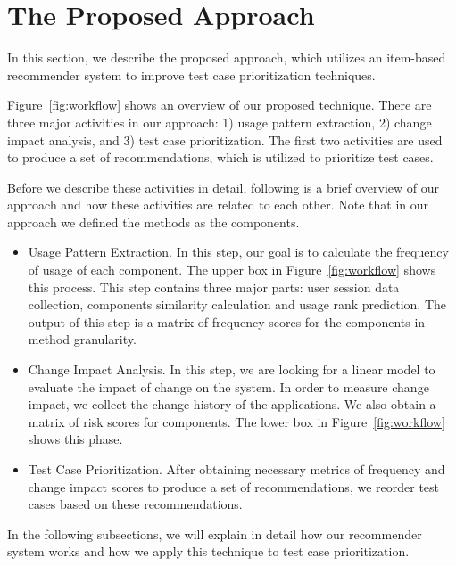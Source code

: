 \vspace*{3pt}
\section{The Proposed Approach}
\label{sec:approach}

In this section, we describe the proposed approach, which utilizes
an item-based recommender system to improve test case prioritization 
techniques. 

Figure~\ref{fig:workflow} shows an overview of our proposed technique.
There are three major activities in our approach: 1) usage pattern extraction,
2) change impact analysis, and 3) test case prioritization.
The first two activities are used to produce a set of recommendations,
which is utilized to prioritize test cases. 

Before we describe these activities in detail, following is a brief overview 
of our approach and how these activities are related to each other. Note that in our approach we defined the methods as the components.

\begin{itemize}
\item{Usage Pattern Extraction.} 
In this step, our goal is to calculate the frequency of usage of each component.  
The upper box in Figure~\ref{fig:workflow} shows this process.
This step contains three major parts: user session data collection,
components similarity calculation and usage rank prediction.  
The output of this step is a matrix of frequency scores for the components in method granularity. 

\item{Change Impact Analysis.} 
In this step,  we are looking for a linear model to evaluate the impact of 
change on the system. In order to measure change impact, we collect the change 
history of the applications.  We also obtain a matrix of risk scores for 
components. The lower box in Figure~\ref{fig:workflow} shows this phase.

\item{Test Case Prioritization.}
After obtaining necessary metrics of frequency and change impact scores
to produce a set of recommendations, we reorder test cases
based on these recommendations.
 
\end{itemize}

In the following subsections,  we will explain in detail how our recommender
system works and how we apply this technique to test case prioritization.

